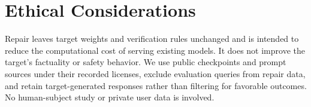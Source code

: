 \documentclass[11pt]{article}
\begin{document}
\section*{Ethical Considerations}
Repair leaves target weights and verification rules unchanged and is intended to reduce the computational cost of serving existing models. It does not improve the target's factuality or safety behavior. We use public checkpoints and prompt sources under their recorded licenses, exclude evaluation queries from repair data, and retain target-generated responses rather than filtering for favorable outcomes. No human-subject study or private user data is involved.



\clearpage
\appendix

\end{document}
